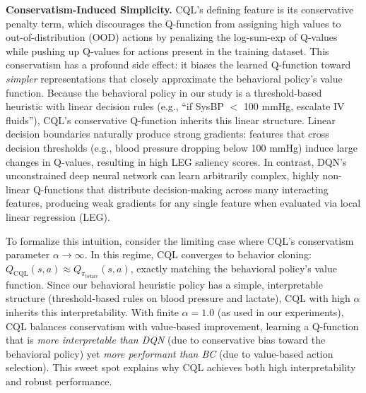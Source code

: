 \textbf{Conservatism-Induced Simplicity.} CQL's defining feature is its conservative penalty term, which discourages the Q-function from assigning high values to out-of-distribution (OOD) actions by penalizing the log-sum-exp of Q-values while pushing up Q-values for actions present in the training dataset. This conservatism has a profound side effect: it biases the learned Q-function toward \textit{simpler} representations that closely approximate the behavioral policy's value function. Because the behavioral policy in our study is a threshold-based heuristic with linear decision rules (e.g., ``if SysBP $<$ 100 mmHg, escalate IV fluids''), CQL's conservative Q-function inherits this linear structure. Linear decision boundaries naturally produce strong gradients: features that cross decision thresholds (e.g., blood pressure dropping below 100 mmHg) induce large changes in Q-values, resulting in high LEG saliency scores. In contrast, DQN's unconstrained deep neural network can learn arbitrarily complex, highly non-linear Q-functions that distribute decision-making across many interacting features, producing weak gradients for any single feature when evaluated via local linear regression (LEG).

To formalize this intuition, consider the limiting case where CQL's conservatism parameter $\alpha \to \infty$. In this regime, CQL converges to behavior cloning: $Q_{\text{CQL}}(s, a) \approx Q_{\pi_{\text{behav}}}(s, a)$, exactly matching the behavioral policy's value function. Since our behavioral heuristic policy has a simple, interpretable structure (threshold-based rules on blood pressure and lactate), CQL with high $\alpha$ inherits this interpretability. With finite $\alpha = 1.0$ (as used in our experiments), CQL balances conservatism with value-based improvement, learning a Q-function that is \textit{more interpretable than DQN} (due to conservative bias toward the behavioral policy) yet \textit{more performant than BC} (due to value-based action selection). This sweet spot explains why CQL achieves both high interpretability and robust performance.

